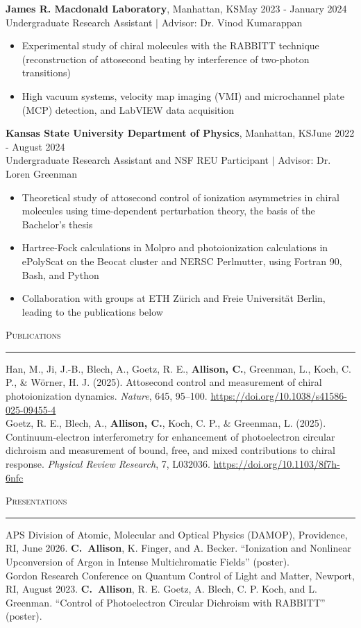 \documentclass{article}
\newcommand{\return}{\\[6pt]}
\newcommand{\sect}[1]{
\needspace{4\baselineskip}\noindent\large{\textsc{#1}}\\[-6pt]\normalsize{\noindent\rule{\textwidth}{0.5pt}}
}
\begin{document}
\textbf{James R. Macdonald Laboratory}, Manhattan, KS\hfill May 2023 - January 2024\\
{Undergraduate Research Assistant $ | $ Advisor: Dr. Vinod Kumarappan} \begin{itemize}
	\item Experimental study of chiral molecules with the RABBITT technique (reconstruction of attosecond beating by interference of two-photon transitions)
	\item High vacuum systems, velocity map imaging (VMI) and microchannel plate (MCP) detection, and LabVIEW data acquisition
\end{itemize}
\textbf{Kansas State University Department of Physics}, Manhattan, KS\hfill June 2022 - August 2024\\
{Undergraduate Research Assistant and NSF REU Participant $ | $ Advisor: Dr. Loren Greenman} \begin{itemize}
	\item Theoretical study of attosecond control of ionization asymmetries in chiral molecules using time-dependent perturbation theory, the basis of the Bachelor's thesis
	\item Hartree-Fock calculations in Molpro and photoionization calculations in ePolyScat on the Beocat cluster and NERSC Perlmutter, using Fortran 90, Bash, and Python
	\item Collaboration with groups at ETH Z\"{u}rich and Freie Universit\"{a}t Berlin, leading to the publications below
\end{itemize}
\sect{Publications}
Han, M., Ji, J.-B., Blech, A., Goetz, R. E., \textbf{Allison, C.}, Greenman, L., Koch, C. P., \& W\"{o}rner, H. J. (2025). Attosecond control and measurement of chiral photoionization dynamics. \textit{Nature}, 645, 95--100. \url{https://doi.org/10.1038/s41586-025-09455-4}\return
Goetz, R. E., Blech, A., \textbf{Allison, C.}, Koch, C. P., \& Greenman, L. (2025). Continuum-electron interferometry for enhancement of photoelectron circular dichroism and measurement of bound, free, and mixed contributions to chiral response. \textit{Physical Review Research}, 7, L032036. \url{https://doi.org/10.1103/8f7h-6nfc}\par\vspace{6pt}
\sect{Presentations}
APS Division of Atomic, Molecular and Optical Physics (DAMOP), Providence, RI, June 2026. \mbox{\textbf{C. Allison}}, K. Finger, and A. Becker. ``Ionization and Nonlinear Upconversion of Argon in Intense Multichromatic Fields'' (poster). \return
Gordon Research Conference on Quantum Control of Light and Matter, Newport, RI, August 2023. \mbox{\textbf{C. Allison}}, R. E. Goetz, A. Blech, C. P. Koch, and L. Greenman. ``Control of Photoelectron Circular Dichroism with RABBITT'' (poster).\par\vspace{6pt}
\end{document}
